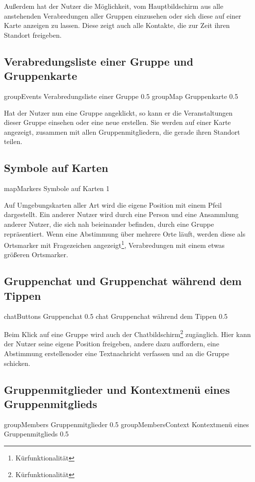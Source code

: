 \documentclass[parskip=full,11pt]{scrartcl}
\begin{document}
Außerdem hat der Nutzer die Möglichkeit, vom Hauptbildschirm aus alle anstehenden Verabredungen aller Gruppen einzusehen oder sich diese auf einer Karte anzeigen zu lassen. 
Diese zeigt auch alle Kontakte, die zur Zeit ihren Standort freigeben.

\pagebreak
\subsection{Verabredungsliste einer Gruppe und Gruppenkarte}
{groupEvents}
{Verabredungsliste einer Gruppe}
{0.5}
{groupMap}
{Gruppenkarte}
{0.5}

Hat der Nutzer nun eine Gruppe angeklickt, so kann er die Veranstaltungen dieser Gruppe einsehen oder eine neue erstellen.
Sie werden auf einer Karte angezeigt, zusammen mit allen Gruppenmitgliedern, die gerade ihren Standort teilen.

\pagebreak
\subsection{Symbole auf Karten}
{mapMarkers}
{Symbole auf Karten}
{1}

Auf Umgebungskarten aller Art wird die eigene Position mit einem Pfeil dargestellt. 
Ein anderer Nutzer wird durch eine Person und eine Ansammlung anderer Nutzer, die sich nah beieinander befinden, durch eine Gruppe repräsentiert.
Wenn eine Abstimmung über mehrere Orte läuft, werden diese als Ortsmarker mit Fragezeichen angezeigt\footnote[1]{Kürfunktionalität}, Verabredungen mit einem etwas größeren Ortsmarker.

\pagebreak
\subsection{Gruppenchat und Gruppenchat während dem Tippen}
{chatButtons}
{Gruppenchat}
{0.5}
{chat}
{Gruppenchat während dem Tippen}
{0.5}

Beim Klick auf eine Gruppe wird auch der
Chatbildschirm\footnote[1]{Kürfunktionalität} zugänglich.
Hier kann der Nutzer seine eigene Position freigeben, andere dazu auffordern,
eine Abstimmung erstellen\footnotemark[1] oder eine Textnachricht verfassen
und an die Gruppe schicken\footnotemark[1].

\pagebreak
\subsection{Gruppenmitglieder und Kontextmenü eines Gruppenmitglieds}
{groupMembers}
{Gruppenmitglieder}
{0.5}
{groupMembersContext}
{Kontextmenü eines Gruppenmitglieds}
{0.5}
\end{document}
